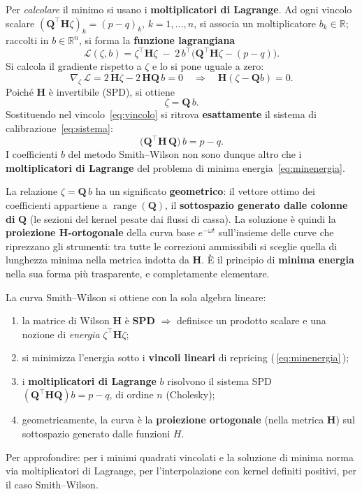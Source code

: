 \documentclass[11pt,a4paper]{article}
\theoremstyle{plain}
\theoremstyle{definition}
\theoremstyle{remark}
\newcommand{\Qmat}{\mathbf{Q}}
\newcommand{\Hmat}{\mathbf{H}}
\newcommand{\transp}{^{\!\top}}
\begin{document}
Per \emph{calcolare} il minimo si usano i \textbf{moltiplicatori di Lagrange}.
Ad ogni vincolo scalare $(\Qmat\transp\Hmat\zeta)_k = (p-q)_k$, $k=1,\ldots,n$,
si associa un moltiplicatore $b_k\in\mathbb{R}$; raccolti in $b\in\mathbb{R}^n$, si forma la
\textbf{funzione lagrangiana}
\begin{equation}
  \mathcal{L}(\zeta,b)
  = \zeta\transp\Hmat\zeta
    \;-\; 2\,b\transp\!\bigl(\Qmat\transp\Hmat\zeta - (p-q)\bigr).
  \label{eq:lagrangiana}
\end{equation}
Si calcola il gradiente rispetto a $\zeta$ e lo si pone uguale a zero:
\[
  \nabla_\zeta\,\mathcal{L}
  = 2\,\Hmat\zeta - 2\,\Hmat\Qmat\,b = 0
  \quad\Longrightarrow\quad
  \Hmat(\zeta - \Qmat b) = 0.
\]
Poich\'e $\Hmat$ \`e invertibile (SPD), si ottiene
\[
  \zeta = \Qmat\, b .
\]
Sostituendo nel vincolo~\eqref{eq:vincolo} si ritrova \textbf{esattamente} il sistema di
calibrazione~\eqref{eq:sistema}:
\[
  \bigl(\Qmat\transp \Hmat\, \Qmat\bigr)\, b = p - q .
\]
I coefficienti $b$ del metodo Smith--Wilson non sono dunque altro che i
\textbf{moltiplicatori di Lagrange} del problema di minima energia~\eqref{eq:minenergia}.

La relazione $\zeta = \Qmat\,b$ ha un significato \textbf{geometrico}: il vettore ottimo dei
coefficienti appartiene a $\operatorname{range}(\Qmat)$, il \textbf{sottospazio generato
dalle colonne di} $\Qmat$ (le sezioni del kernel pesate dai flussi di cassa). La soluzione
\`e quindi la \textbf{proiezione $\Hmat$-ortogonale} della curva base $e^{-\omega t}$
sull'insieme delle curve che riprezzano gli strumenti: tra tutte le correzioni ammissibili
si sceglie quella di lunghezza minima nella metrica indotta da $\Hmat$. \`E il principio di
\textbf{minima energia} nella sua forma pi\`u trasparente, e completamente elementare.

\begin{keybox}
La curva Smith--Wilson si ottiene con la sola algebra lineare:
\begin{enumerate}
  \item la matrice di Wilson $\Hmat$ \`e \textbf{SPD} $\Rightarrow$ definisce un prodotto
        scalare e una nozione di \emph{energia} $\zeta\transp\Hmat\zeta$;
  \item si minimizza l'energia sotto i \textbf{vincoli lineari} di repricing
        (\,\eqref{eq:minenergia}\,);
  \item i \textbf{moltiplicatori di Lagrange} $b$ risolvono il sistema SPD
        $(\Qmat\transp\Hmat\Qmat)b = p-q$, di ordine $n$ (Cholesky);
  \item geometricamente, la curva \`e la \textbf{proiezione ortogonale} (nella metrica
        $\Hmat$) sul sottospazio generato dalle funzioni $H$.
\end{enumerate}
Per approfondire: \cite{boyd2018} per i minimi quadrati vincolati e la soluzione di minima
norma via moltiplicatori di Lagrange, \cite{fasshauer2007} per l'interpolazione con kernel
definiti positivi, \cite{lageras2016} per il caso Smith--Wilson.
\end{keybox}
\end{document}

